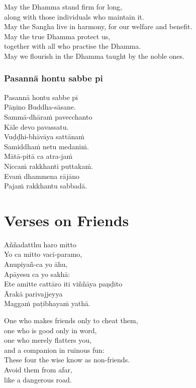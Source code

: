 \begin{english}
  May the Dhamma stand firm for long,\\
  along with those individuals who maintain it.\\
  May the Sangha live in harmony, for our welfare and benefit.\\
  May the true Dhamma protect us,\\
  together with all who practise the Dhamma.\\
  May we flourish in the Dhamma taught by the noble ones.
\end{english}

\subsubsection{Pasannā hontu sabbe pi}


\begin{paritta}
Pasannā hontu sabbe pi\\
Pāṇino Buddha-sāsane.\\
Sammā-dhāraṁ pavecchanto\\
Kāle devo pavassatu.\\
Vuḍḍhi-bhāvāya sattānaṁ\\
Samiddhaṁ netu medaniṁ.\\
Mātā-pitā ca atra-jaṁ\\
Niccaṁ rakkhanti puttakaṁ.\\
Evaṁ dhammena rājāno\\
Pajaṁ rakkhantu sabbadā.
\end{paritta}

\section{Verses on Friends}


Aññadatthu haro mitto\\
Yo ca mitto vacī-paramo,\\
Anupiyañ-ca yo āhu,\\
Apāyesu ca yo sakhā:\\
Ete amitte cattāro iti viññāya paṇḍito\\
Ārakā parivajjeyya\\
Maggaṁ paṭibhayaṁ yathā.\\

\begin{english}
  One who makes friends only to cheat them,\\
  one who is good only in word,\\
  one who merely flatters you,\\
  and a companion in ruinous fun:\\
  These four the wise know as non-friends.\\
  Avoid them from afar,\\
  like a dangerous road.
\end{english}

